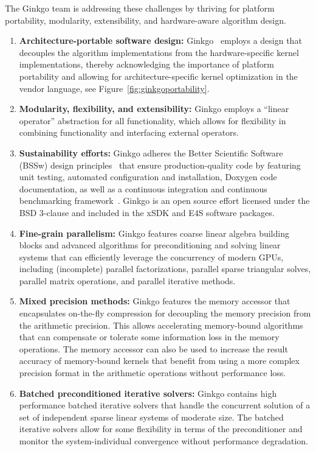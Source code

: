 The Ginkgo team is addressing these challenges by thriving for platform portability, modularity, 
extensibility, and hardware-aware algorithm design.
\begin{enumerate}
    \item \textbf{Architecture-portable software design:}
     Ginkgo~\cite{anzt2020ginkgo} employs a design that decouples the
	algorithm implementations from the hardware-specific kernel implementations, 
	thereby acknowledging the importance of platform portability and allowing 
	for architecture-specific kernel optimization in the vendor language, see Figure~\ref{fig:ginkgoportability}. 
    \item \textbf{Modularity, flexibility, and extensibility:} 
    Ginkgo employs a ``linear operator'' abstraction for all functionality, which allows for 
    flexibility in combining functionality and interfacing external operators.
   \item \textbf{Sustainability efforts:}
	Ginkgo adheres the Better Scientific Software (BSSw) design 
	principles~\cite{betterscientificsoftware} that ensure production-quality 
	code by featuring unit testing, automated configuration and installation, 
	Doxygen code documentation, as well as a continuous integration and 
	continuous benchmarking framework~\cite{pasc_anzt}. 
	Ginkgo is an open source effort licensed under the BSD 3-clause and included in the xSDK and E4S software packages.
   \item \textbf{Fine-grain parallelism:} 
    Ginkgo features coarse linear algebra building blocks and advanced algorithms for 
    preconditioning and solving linear systems that can efficiently leverage the concurrency 
    of modern GPUs, including (incomplete) parallel factorizations, 
    parallel sparse triangular solves, parallel matrix operations, and parallel iterative methods.
	\item \textbf{Mixed precision methods:} 
	Ginkgo features the memory accessor that encapsulates on-the-fly compression for 
	decoupling the memory precision from the arithmetic precision. 
	This allows accelerating memory-bound algorithms that can compensate or tolerate 
	some information loss in the memory operations. The memory accessor can also be used
	to increase the result accuracy of memory-bound kernels that benefit from using a 
	more complex precision format in the arithmetic operations without performance loss.
	\item \textbf{Batched preconditioned iterative solvers:} 
	Ginkgo contains high performance batched iterative solvers that handle the 
	concurrent solution of a set of independent sparse linear systems of moderate size.
	The batched iterative solvers allow for some flexibility in terms of the preconditioner and
	monitor the system-individual convergence without performance degradation.
\end{enumerate}

